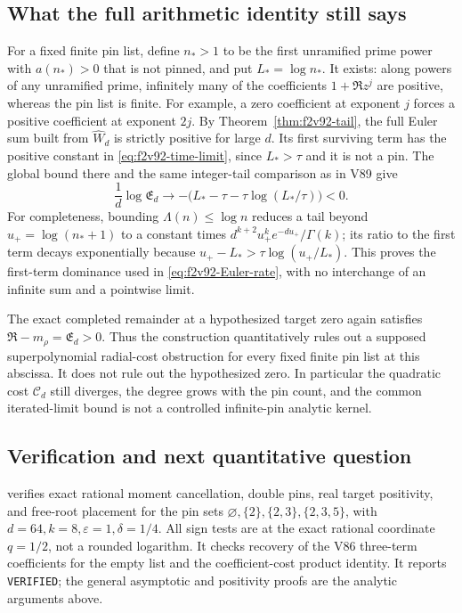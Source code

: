 \documentclass[11pt]{article}
\theoremstyle{definition}
\theoremstyle{remark}
\begin{document}
\subsection{What the full arithmetic identity still says}

For a fixed finite pin list, define \(n_*>1\) to be the first
unramified prime power with \(a(n_*)>0\) that is not pinned, and put
\(L_*=\log n_*\).  It exists: along powers of any unramified prime,
infinitely many of the coefficients \(1+\Re z^j\) are positive,
whereas the pin list is finite.  For example, a zero coefficient at
exponent \(j\) forces a positive coefficient at exponent \(2j\).
By Theorem~\ref{thm:f2v92-tail}, the full Euler sum built from
\(\widehat W_d\) is strictly positive for large \(d\).  Its first
surviving term has the positive constant in
\eqref{eq:f2v92-time-limit}, since \(L_*>\tau\) and it is not a pin.
The global bound there and the same integer-tail comparison as in V89
give
\begin{equation}
 \frac1d\log\mathfrak E_d\longrightarrow
 -\bigl(L_*-\tau-\tau\log(L_*/\tau)\bigr)<0.
 \label{eq:f2v92-Euler-rate}
\end{equation}
For completeness, bounding \(\Lambda(n)\le\log n\) reduces a
tail beyond \(u_+=\log(n_*+1)\) to a constant times
\(d^{k+2}u_+^ke^{-du_+}/\Gamma(k)\); its ratio to the first term
decays exponentially because
\(u_+-L_*>\tau\log(u_+/L_*)\).  This proves the first-term
dominance used in \eqref{eq:f2v92-Euler-rate}, with no interchange
of an infinite sum and a pointwise limit.

The exact completed remainder at a hypothesized target zero again
satisfies \(\mathfrak R-m_\rho=\mathfrak E_d>0\).  Thus the
construction quantitatively rules out a supposed superpolynomial
radial-cost obstruction for every fixed finite pin list at this
abscissa.  It does not rule out the hypothesized zero.  In particular
the quadratic cost \(\mathcal C_d\) still diverges, the degree
grows with the pin count, and the common iterated-limit bound is not
a controlled infinite-pin analytic kernel.

\subsection*{Verification and next quantitative question}

 verifies exact
rational moment cancellation, double pins, real target positivity,
and free-root placement for the pin sets
\(\varnothing,\{2\},\{2,3\},\{2,3,5\}\), with
\(d=64,k=8,\varepsilon=1,\delta=1/4\).  All sign tests are at
the exact rational coordinate \(q=1/2\), not a rounded logarithm.
It checks recovery of the V86 three-term coefficients for the empty
list and the coefficient-cost product identity.  It reports
\texttt{VERIFIED}; the general asymptotic and positivity proofs are
the analytic arguments above.
\end{document}
